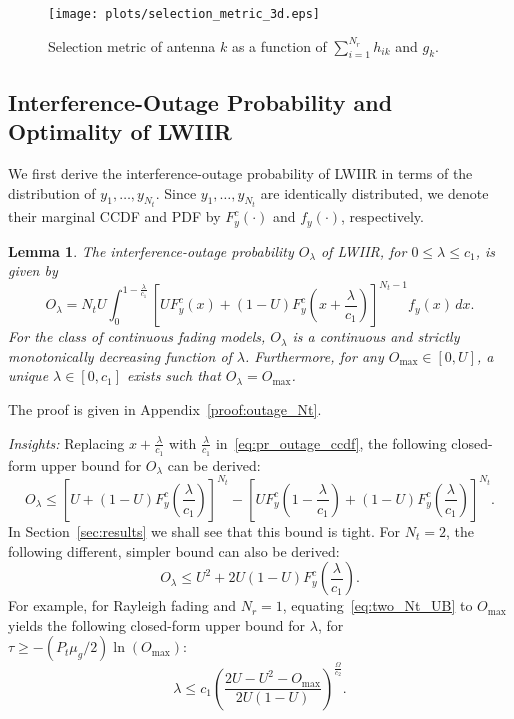 \documentclass[12pt,draftcls,peerreview,onecolumn]{IEEEtran}
\newtheorem{lemma}{{\bf Lemma}}
\newcommand{\lam}{\lambda}
\newcommand{\mug}{{\mu_{g}}}
\newcommand{\Nt}{{N_t}}
\newcommand{\Nr}{{N_r}}
\newcommand{\Pt}{{P_t}}
\newcommand{\such}{h}
\newcommand{\puch}{g}
\newcommand{\hk}[1]{{\such_{#1}}}
\newcommand{\gk}[1]{{\puch_{#1}}}
\newcommand{\outmax}{O_{\text{max}}}
\newcommand{\itau}{\tau}
\newcommand{\cone}{c_{1}}
\newcommand{\ctwo}{c_{2}}
\newcommand{\out}{O}
\newcommand{\lambym}{\frac{\lam}{\cone}}
\newcommand{\yk}[1]{y_{#1}}
\newcommand{\al}{\ctwo}
\newcommand{\snr}{\Omega}
\newcommand{\snrbyal}[1][]{\frac{\snr#1}{\al}}
\newcommand{\un}{U}
\newcommand{\outlam}{\out_{\lam}}
\newcommand{\sumnr}{\sum_{i=1}^{\Nr}}
\begin{document}
\begin{figure}
\centering 
\texttt{[image: plots/selection\_metric\_3d.eps]}
\caption{Selection metric of antenna $k$ as a function of $\sumnr\hk{ik}$ and $\gk{k}$.}
\label{fig:metric}
\end{figure}

\subsection{Interference-Outage Probability and Optimality of LWIIR}
We first derive the interference-outage probability of LWIIR in terms of the distribution of $\yk{1},\ldots,\yk{\Nt}$. Since $\yk{1},\ldots,\yk{\Nt}$ are identically distributed, we denote their marginal CCDF and PDF by $F_{y}^{c}(\cdot)$ and $f_{y}(\cdot)$, respectively. 
\begin{lemma}
\label{lem:outage_Nt}
The interference-outage probability $\outlam$ of LWIIR, for $0\leq\lam\leq\cone$, is given by
\begin{equation}
\label{eq:pr_outage_ccdf} 
\outlam  =  \Nt\un \int_{0}^{1-\lambym} 	
\left[ \un F_{y}^{c}\left(x\right) + \left(1 -\un\right)F_{y}^{c}\left(x+\lambym\right) \right]^{\Nt-1} f_{y}(x)\,dx.
\end{equation}
For the class of continuous fading models, $\outlam$ is a continuous and strictly monotonically decreasing function of $\lam$. Furthermore, for any $\outmax\in[0,\un]$, a unique $\lam\in[0,\cone]$ exists such that $\outlam=\outmax$. 
\end{lemma}
%
\begin{IEEEproof}
    The proof is given in Appendix~\ref{proof:outage_Nt}.
\end{IEEEproof}
%

{\em Insights:} Replacing $x+\lambym$ with $\lambym$ in~\eqref{eq:pr_outage_ccdf}, the following closed-form upper bound for $\outlam$ can be derived: 
%
\begin{equation}
\label{eq:pr_outage_ub}
\outlam  \leq \left[ \un + \left(1-\un\right)F_{y}^{c}\left(\lambym\right)  \right]^{\Nt} - \left[ \un F_{y}^{c}\left(1-\lambym\right) + \left(1-\un\right)F_{y}^{c}\left(\lambym\right)  \right]^{\Nt}.
\end{equation}
%
In Section~\eqref{sec:results} we shall see that this bound is tight. For $\Nt = 2$, the following different, simpler bound can also be derived: 
%
\begin{equation}
\label{eq:two_Nt_UB}
\outlam \leq \un^2 + 2\un(1-\un)F_{y}^{c}\left(\lambym\right).
\end{equation}
For example, for Rayleigh fading and $\Nr=1$, equating~\eqref{eq:two_Nt_UB} to $\outmax$ yields the following closed-form upper bound for $\lam$, for $\itau\geq-\left( \Pt\mug/{2}\right) \ln\left({\outmax}\right)$:
%
\begin{equation}
\label{eq:two_Nt_lam}
\lam \leq \cone \left( \frac{2\un - \un^2 - \outmax}{2\un(1-\un)} \right)^{\snrbyal[]}.
\end{equation} 
\end{document}
